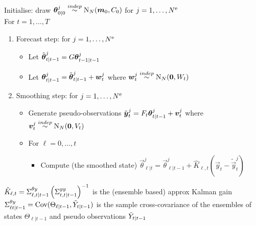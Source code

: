 \begin{frame}
\small
Initialise: draw $\boldsymbol{\theta}_{0|0}^j \overset{indep}{\sim } \text{N}_N(\boldsymbol{m}_0, C_0)$ for $j=1,\dots,{N^\text{e}}$ \\
For $t=1,\dots,T$
\begin{enumerate}
\item Forecast step: for $j=1,\dots,{N^\text{e}}$
\begin{itemize}
\item Let $\tilde{\boldsymbol{\theta}}_{{t \vert t-1}}^j = G\boldsymbol{\theta}_{{t-1 \vert t-1}}^j$ 
\item Let $\boldsymbol{\theta}_{{t \vert t-1}}^j = \tilde{\boldsymbol{\theta}}_{{t \vert t-1}}^j + \boldsymbol{w}_t^j$ where  $\boldsymbol{w}^j_t \overset{indep}{\sim } \text{N}_N(\boldsymbol{0},W_t)$ 
\end{itemize}
\item Smoothing step: for $j=1,\dots,{N^\text{e}}$
\begin{itemize}
\item Generate pseudo-observations $\tilde{\boldsymbol{y}}^j_t = F_t \boldsymbol{\theta}_{{t \vert t-1}}^j + \boldsymbol{v}_t^j$ where $\boldsymbol{v}_t^j \overset{indep}{\sim } \text{N}_N(\boldsymbol{0}, V_t)$
\item For $\ell=0,\dots,t$
\begin{itemize}
\item Compute (the smoothed state) $\vec\theta_{\ell|t}^j = \vec\theta_{\ell|t-1}^j + \hat{K}_{\ell,t}(\vec{y}_t - \tilde{\vec{y}}^j_t)$
\end{itemize}
\end{itemize}
\end{enumerate}
$\hat{K}_{\ell,t} = \Sigma_{\ell,{t \vert t-1}}^{\theta y} \left( \Sigma_{t,{t \vert t-1}}^{yy} \right)^{-1}$ is the (ensemble based) approx Kalman gain \\
\phantom{row} 
$\Sigma^{\theta y}_{\ell t|t-1} = \text{Cov}(\Theta_{\ell|t-1},\tilde{Y}_{{t \vert t-1}})$ is the sample cross-covariance of the ensembles of states $\Theta_{\ell|t-1}$ and pseudo observations $\tilde{Y}_{{t \vert t-1}}$
\end{frame}



